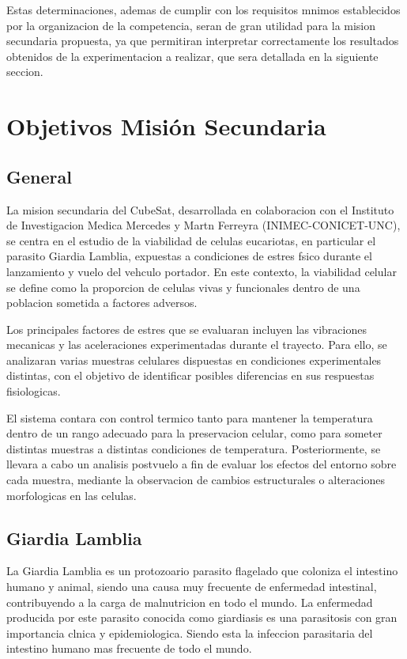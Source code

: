 Estas determinaciones, ademas de cumplir con los requisitos mnimos establecidos por la
organizacion de la competencia, seran de gran utilidad para la mision secundaria propuesta,
ya que permitiran interpretar correctamente los resultados obtenidos de la experimentacion
a realizar, que sera detallada en la siguiente seccion.

\section{Objetivos Misión Secundaria}
  \subsection{General}
    La mision secundaria del CubeSat, desarrollada en colaboracion con el Instituto de Investigacion
    Medica Mercedes y Martn Ferreyra (INIMEC-CONICET-UNC), se centra en
    el estudio de la viabilidad de celulas eucariotas, en particular el parasito Giardia Lamblia,
    expuestas a condiciones de estres fsico durante el lanzamiento y vuelo del vehculo portador. En
    este contexto, la viabilidad celular se define como la proporcion de celulas vivas y
    funcionales dentro de una poblacion sometida a factores adversos.

    Los principales factores de estres que se evaluaran incluyen las vibraciones mecanicas y
    las aceleraciones experimentadas durante el trayecto. Para ello, se analizaran varias muestras
    celulares dispuestas en condiciones experimentales distintas, con el objetivo de identificar
    posibles diferencias en sus respuestas fisiologicas.

    El sistema contara con control termico tanto para mantener la temperatura dentro de
    un rango adecuado para la preservacion celular, como para someter distintas muestras a
    distintas condiciones de temperatura. Posteriormente, se llevara a cabo un analisis postvuelo a
    fin de evaluar los efectos del entorno sobre cada muestra, mediante la observacion de
    cambios estructurales o alteraciones morfologicas en las celulas.

  \subsection{Giardia Lamblia}
    La Giardia Lamblia es un protozoario parasito flagelado que coloniza el intestino humano
    y animal, siendo una causa muy frecuente de enfermedad intestinal, contribuyendo a la carga
    de malnutricion en todo el mundo. La enfermedad producida por este parasito conocida
    como giardiasis es una parasitosis con gran importancia clnica y epidemiologica. Siendo esta
    la infeccion parasitaria del intestino humano mas frecuente de todo el mundo.

